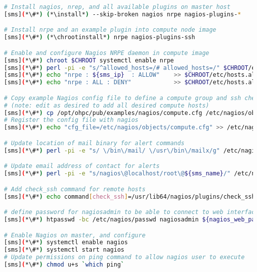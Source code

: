 \begin{lstlisting}[language=bash,keywords={},upquote=true]
# Install nagios, nrep, and all available plugins on master host
[sms](*\#*) (*\install*) --skip-broken nagios nrpe nagios-plugins-*

# Install nrpe and an example plugin into compute node image
[sms](*\#*) (*\chrootinstall*) nrpe nagios-plugins-ssh

# Enable and configure Nagios NRPE daemon in compute image 
[sms](*\#*) chroot $CHROOT systemctl enable nrpe
[sms](*\#*) perl -pi -e "s/^allowed_hosts=/# allowed_hosts=/" $CHROOT/etc/nagios/nrpe.cfg
[sms](*\#*) echo "nrpe : ${sms_ip}  : ALLOW"    >> $CHROOT/etc/hosts.allow
[sms](*\#*) echo "nrpe : ALL : DENY"            >> $CHROOT/etc/hosts.allow

# Copy example Nagios config file to define a compute group and ssh check
# (note: edit as desired to add all desired compute hosts)
[sms](*\#*) cp /opt/ohpc/pub/examples/nagios/compute.cfg /etc/nagios/objects
# Register the config file with nagios
[sms](*\#*) echo "cfg_file=/etc/nagios/objects/compute.cfg" >> /etc/nagios/nagios.cfg

# Update location of mail binary for alert commands
[sms](*\#*) perl -pi -e "s/ \/bin\/mail/ \/usr\/bin\/mailx/g" /etc/nagios/objects/commands.cfg

# Update email address of contact for alerts
[sms](*\#*) perl -pi -e "s/nagios\@localhost/root\@${sms_name}/" /etc/nagios/objects/contacts.cfg

# Add check_ssh command for remote hosts
[sms](*\#*) echo command[check_ssh]=/usr/lib64/nagios/plugins/check_ssh localhost $CHROOT/etc/nagios/nrpe.cfg

# define password for nagiosadmin to be able to connect to web interface
[sms](*\#*) htpasswd -bc /etc/nagios/passwd nagiosadmin ${nagios_web_password}

# Enable Nagios on master, and configure
[sms](*\#*) systemctl enable nagios
[sms](*\#*) systemctl start nagios
# Update permissions on ping command to allow nagios user to execute
[sms](*\#*) chmod u+s `which ping`
\end{lstlisting}

